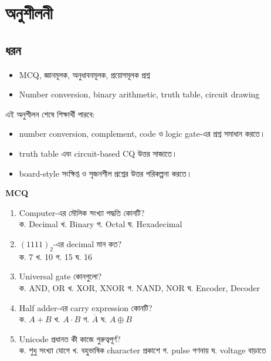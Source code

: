 \section{অনুশীলনী}

\subsection{ধরন}
\begin{itemize}
\item MCQ, জ্ঞানমূলক, অনুধাবনমূলক, প্রয়োগমূলক প্রশ্ন
\item Number conversion, binary arithmetic, truth table, circuit drawing
\end{itemize}

\begin{learningbox}
এই অনুশীলন শেষে শিক্ষার্থী পারবে:
\begin{itemize}
\item number conversion, complement, code ও logic gate-এর প্রশ্ন সমাধান করতে।
\item truth table এবং circuit-based CQ উত্তর সাজাতে।
\item board-style সংক্ষিপ্ত ও সৃজনশীল প্রশ্নের উত্তর পরিকল্পনা করতে।
\end{itemize}
\end{learningbox}

\begin{practicebox}
\textbf{MCQ}
\begin{enumerate}
\item Computer-এর মৌলিক সংখ্যা পদ্ধতি কোনটি?\\
ক. Decimal \quad খ. Binary \quad গ. Octal \quad ঘ. Hexadecimal
\item $(1111)_2$-এর decimal মান কত?\\
ক. 7 \quad খ. 10 \quad গ. 15 \quad ঘ. 16
\item Universal gate কোনগুলো?\\
ক. AND, OR \quad খ. XOR, XNOR \quad গ. NAND, NOR \quad ঘ. Encoder, Decoder
\item Half adder-এর carry expression কোনটি?\\
ক. $A+B$ \quad খ. $A\cdot B$ \quad গ. $\overline{A}$ \quad ঘ. $A\oplus B$
\item Unicode প্রধানত কী কাজে গুরুত্বপূর্ণ?\\
ক. শুধু সংখ্যা যোগে \quad খ. বহুভাষিক character প্রকাশে \quad গ. pulse গণনায় \quad ঘ. voltage বাড়াতে
\end{enumerate}
\end{practicebox}

